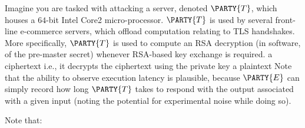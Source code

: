 %



Imagine you are tasked with attacking a server, denoted 
$\PARTY{T}$, 
which houses a $64$-bit Intel Core2 micro-processor.  
$\PARTY{T}$ 
is used by several front-line e-commerce servers, which offload computation 
relating to TLS handshakes.  More specifically, 
$\PARTY{T}$ 
is used to compute an RSA decryption (in software, of the pre-master secret)
whenever RSA-based key exchange is required.
{a ciphertext}
{i.e., it decrypts the ciphertext using the private key}
{a  plaintext}
Note that the ability to observe execution latency is plausible, because
$\PARTY{E}$ 
can simply record how long
$\PARTY{T}$ 
takes to respond with the output associated with a given input (noting the potential for experimental noise while doing so).




%
Note that:


